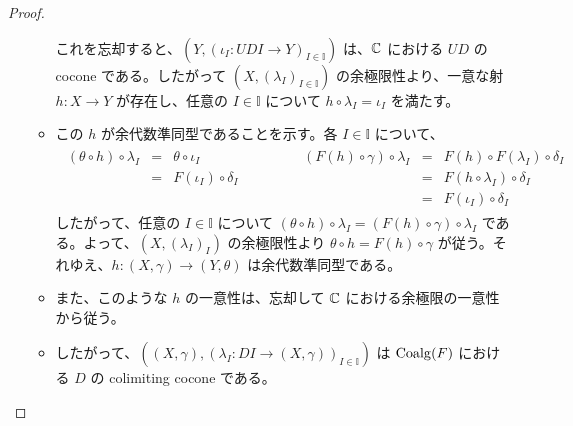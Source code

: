 \documentclass[
		head_space=20mm,
		foot_space=20mm,
		gutter=10mm,
		line_length=190mm
]{jlreq}
\begin{document}
\begin{proof}
\begin{itemize}
\begin{itemize}
			これを忘却すると、$(Y,(\iota_I:UDI\to Y)_{I\in\mathbb I})$ は、$\C$ における $UD$ の cocone である。したがって $(X,(\lambda_I)_{I\in\mathbb I})$ の余極限性より、一意な射 $h:X\to Y$ が存在し、任意の $I\in\mathbb I$ について $h\circ\lambda_I=\iota_I$ を満たす。
			\item この $h$ が余代数準同型であることを示す。各 $I\in\mathbb I$ について、
			\begin{align*}
				\begin{array}{rclcrcl}
					(\theta\circ h)\circ\lambda_I &=& \theta\circ\iota_I & \quad\qquad & (F(h)\circ\gamma)\circ\lambda_I &=& F(h)\circ F(\lambda_I)\circ\delta_I \\
					{} &=& F(\iota_I)\circ\delta_I & & {} & = & F(h\circ\lambda_I)\circ\delta_I\\
					{} & {} & {} & {} & {} & = & F(\iota_I)\circ\delta_I
				\end{array}
			\end{align*}
			\noindent したがって、任意の $I\in\mathbb I$ について $(\theta\circ h)\circ\lambda_I=(F(h)\circ\gamma)\circ\lambda_I$ である。よって、$(X,(\lambda_I)_I)$ の余極限性より $\theta\circ h=F(h)\circ\gamma$ が従う。それゆえ、$h:(X,\gamma)\to(Y,\theta)$ は余代数準同型である。
			\item また、このような $h$ の一意性は、忘却して $\C$ における余極限の一意性から従う。
			\item したがって、$((X,\gamma),(\lambda_I:DI\to(X,\gamma))_{I\in\mathbb I})$ は $\mathrm{Coalg}(F)$ における $D$ の colimiting cocone である。
		\end{itemize}
	\end{itemize}
	\begin{multicols}{2}
		\begin{center}

\end{center}
\end{multicols}
\end{proof}
\end{document}
